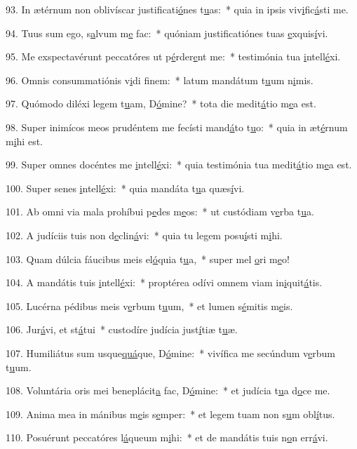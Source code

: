 93. In ætérnum non oblivíscar justificati\uline{ó}nes t\uline{u}as:~* quia in ipsis viv\uline{i}fic\uline{á}sti me.\par 
94. Tuus sum ego, s\uline{a}lvum m\uline{e} fac:~* quóniam justificatiónes tuas \uline{e}xquis\uline{í}vi.\par 
95. Me exspectavérunt peccatóres ut p\uline{é}rder\uline{e}nt me:~* testimónia tua \uline{i}ntell\uline{é}xi.\par 
96. Omnis consummatiónis v\uline{i}di f\uline{i}nem:~* latum mandátum t\uline{u}um n\uline{i}mis.\par 
97. Quómodo diléxi legem t\uline{u}am, D\uline{ó}mine?~* tota die medit\uline{á}tio m\uline{e}a est.\par 
98. Super inimícos meos prudéntem me fecísti mand\uline{á}to t\uline{u}o:~* quia in æt\uline{é}rnum m\uline{i}hi est.\par 
99. Super omnes docéntes me \uline{i}ntell\uline{é}xi:~* quia testimónia tua medit\uline{á}tio m\uline{e}a est.\par 
100. Super senes \uline{i}ntell\uline{é}xi:~* quia mandáta t\uline{u}a quæs\uline{í}vi.\par 
101. Ab omni via mala prohíbui p\uline{e}des m\uline{e}os:~* ut custódiam v\uline{e}rba t\uline{u}a.\par 
102. A judíciis tuis non d\uline{e}clin\uline{á}vi:~* quia tu legem posu\uline{í}sti m\uline{i}hi.\par 
103. Quam dúlcia fáucibus meis el\uline{ó}quia t\uline{u}a,~* super mel \uline{o}ri m\uline{e}o!\par 
104. A mandátis tuis \uline{i}ntell\uline{é}xi:~* proptérea odívi omnem viam in\uline{i}quit\uline{á}tis.\par 
105. Lucérna pédibus meis v\uline{e}rbum t\uline{u}um,~* et lumen s\uline{é}mitis m\uline{e}is.\par 
106. Jur\uline{á}vi, et st\uline{á}tui~* custodíre judícia just\uline{í}tiæ t\uline{u}æ.\par 
107. Humiliátus sum usque\uline{quá}que, D\uline{ó}mine:~* vivífica me secúndum v\uline{e}rbum t\uline{u}um.\par 
108. Voluntária oris mei beneplácit\uline{a} fac, D\uline{ó}mine:~* et judícia t\uline{u}a d\uline{o}ce me.\par 
109. Anima mea in mánibus m\uline{e}is s\uline{e}mper:~* et legem tuam non s\uline{u}m obl\uline{í}tus.\par 
110. Posuérunt peccatóres l\uline{á}queum m\uline{i}hi:~* et de mandátis tuis n\uline{o}n err\uline{á}vi.\par 
